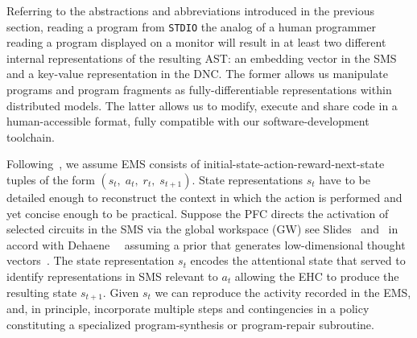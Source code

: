 




Referring to the abstractions and abbreviations introduced in the previous section, reading a program from {\tt{STDIO}} \emdash{} the analog of a human programmer reading a program displayed on a monitor \emdash{} will result in \emdash{} at least \emdash{} two different internal representations of the resulting AST: an embedding vector in the SMS and a key-value representation in the DNC. The former allows us manipulate programs and program fragments as fully-differentiable representations within distributed models. The latter allows us to modify, execute and share code in a human-accessible format, fully compatible with our software-development toolchain.

Following~\cite{PritzeletalICML-17}, we assume EMS consists of initial-state-action-reward-next-state tuples of the form $(s_{t},\;a_{t},\;r_{t},\;s_{t+1})$. State representations $s_{t}$ have to be detailed enough to reconstruct the context in which the action is performed and yet concise enough to be practical. Suppose the PFC directs the activation of selected circuits in the SMS via the global workspace (GW) \emdash{} see Slides~{{}} and~{{}} \emdash{} in accord with Dehaene~\etal{}~\cite{DehaeneetalSCIENCE-17,Dehaene2014} assuming a prior that generates low-dimensional thought vectors~\cite{BengioCoRR-17}. The state representation $s_{t}$ encodes the attentional state that served to identify representations in SMS relevant to $a_{t}$ allowing the EHC to produce the resulting state $s_{t+1}$. Given $s_{t}$ we can reproduce the activity recorded in the EMS, and, in principle, incorporate multiple steps and contingencies in a policy constituting a specialized program-synthesis or program-repair subroutine.

